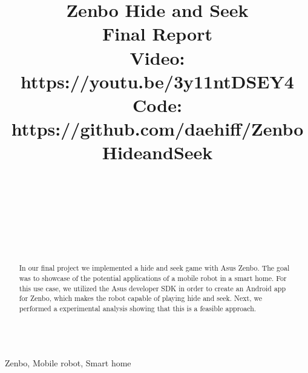 \documentclass[conference]{IEEEtran}
\begin{document}
\title{Zenbo Hide and Seek \\ Final Report \\ {\large Video: https://youtu.be/3y11ntDSEY4} \\ {\large Code: https://github.com/daehiff/ZenboHideandSeek}}
\author{\\
	\and\\
	\and\\
	\and\\
}
\maketitle

\begin{abstract}
	In our final project we implemented a hide and seek game with Asus Zenbo. 
	The goal was to showcase of the potential applications of a mobile robot in a smart
	home. For this use case, we utilized the Asus developer SDK in order to create an Android app for 
	Zenbo, which makes the robot capable of playing hide and seek. Next, we performed a experimental analysis showing
	that this is a feasible approach.\\\\
\end{abstract}
\begin{IEEEkeywords}
	Zenbo, Mobile robot, Smart home
\end{IEEEkeywords}
\end{document}
